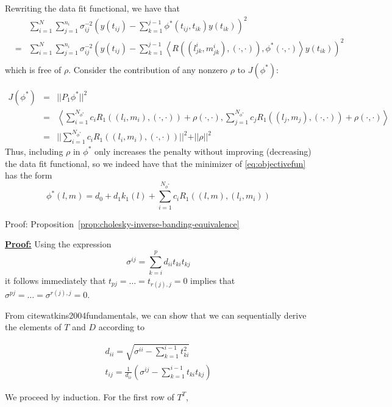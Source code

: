 \documentclass[12pt]{article}
\theoremstyle{definition}
\begin{document}
Rewriting the data fit functional, we have that  
 \begin{eqnarray*}
&\mbox{ }&\sum_{i=1}^N \sum_{j=1}^{n_i} \sigma_{ij}^{-2} \left(y\left(t_{ij}\right) - \sum_{k=1}^{j-1} \phi^*\left(t_{ij}, t_{ik}  \right) y\left(t_{ik}\right)  \right)^2  \\ 
&=& \sum_{i=1}^N \sum_{j=1}^{n_i} \sigma_{ij}^{-2} \left(y\left(t_{ij}\right) - \sum_{k=1}^{j-1} \left< R\left(\left(l^i_{jk},m^i_{jk}\right),\left(\cdot,\cdot\right) \right),\phi^*\left(\cdot,\cdot\right)\right> y\left(t_{ik}\right)  \right)^2  \\
 \end{eqnarray*}
\noindent
which is free of $\rho$. Consider the contribution of any nonzero $\rho$ to $J\left(\phi^*\right)$: 
  
 \begin{eqnarray*}
 J\left(\phi^*\right) &=& \vert \vert  P_1\phi^* \vert \vert^2\\
 &=& \left< \sum_{i=1}^{N_{\phi^*}}  c_i R_1\left( \left(l_i,m_i\right),\left(\cdot,\cdot\right) \right) + \rho\left(\cdot,\cdot \right), \sum_{j=1}^{N_{\phi^*}} c_j R_1\left( \left(l_j,m_j\right),\left(\cdot,\cdot\right) \right) + \rho\left(\cdot,\cdot\right)\right> \\
 &=& \vert \vert \sum_{i=1}^{N_{\phi^*}}  c_i R_1\left(\left(l_i,m_i\right),\left(\cdot,\cdot\right) \right) \vert \vert^2 + \vert \vert  \rho \vert \vert^2 
 \end{eqnarray*}
\noindent
Thus, including $\rho$ in $\phi^*$ only increases the penalty without improving (decreasing) the data fit functional, so we indeed have that the minimizer of \eqref{eq:objectivefun} has the form
\begin{equation}
 \phi^*\left(l,m\right) =  d_0 + d_1k_1\left(l\right) + \sum_{i=1}^{N_{\phi^*}} c_i R_1\left( \left(l,m\right) , \left(l_i,m_i \right)\right)
 \label{eq:finitedimsolution}
 \end{equation}


Proof: Proposition~\ref{prop:cholesky-inverse-banding-equivalence}

\underline{\bf Proof:} Using the expression
\[
\sigma^{ij} = \sum_{k=i}^p d_{ii}t_{ki}t_{kj}
\]
it follows immediately that $t_{pj} = \dots = t_{r\left(j\right),j} = 0$ implies that $\sigma^{pj} = \dots = \sigma^{r\left(j\right),j} = 0$.

From cite{watkins2004fundamentals}, we can show that we can sequentially derive the elements of $T$ and $D$ according to 

\begin{eqnarray*}
d_{ii} = \sqrt{\sigma^{ii}-\sum_{k=1}^{i-1} t_{ki}^2 }\\
t_{ij} = \frac{1}{d_{ii}}\left(\sigma^{ij} - \sum_{k=1}^{i-1} t_{ki}t_{kj} \right)
\end{eqnarray*}
\noindent

We proceed by induction. For the first row of $T^T$, 




\end{document}
